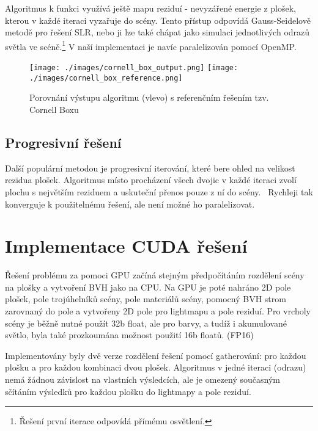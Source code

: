 \documentclass[czech]{pyt-report}
\begin{document}
Algoritmus k funkci využívá ještě mapu reziduí - nevyzářené energie z plošek, kterou v každé iteraci vyzařuje do scény. Tento přístup odpovídá Gauss-Seidelově metodě pro řešení SLR, nebo ji lze také chápat jako simulaci jednotlivých odrazů světla ve scéně.\footnote{Řešení první iterace odpovídá přímému osvětlení.} V naší implementaci je navíc paralelizován pomocí OpenMP.

\begin{figure}[h]
  \centering\leavevmode
  \texttt{[image: ./images/cornell\_box\_output.png]}
  \texttt{[image: ./images/cornell\_box\_reference.png]}\vskip-0.5cm
  \bigskip
  \caption{Porovnání výstupu algoritmu (vlevo) s referenčním řešením tzv. Cornell Boxu}
  \label{fig:cornell_box}
\end{figure}

\subsection{Progresivní řešení}
\label{sec:radiosita-prog}

Další populární metodou je progresivní iterování, které bere ohled na velikost rezidua plošek. Algoritmus místo procházení všech dvojic v každé iteraci zvolí plochu s největším reziduem a uskuteční přenos pouze z ní do scény.~\cite{Cohen1993} Rychleji tak konverguje k použitelnému řešení, ale není možné ho paralelizovat.

\section{Implementace CUDA řešení}
\label{sec:cuda}

Řešení problému za pomoci GPU začíná stejným předpočítáním rozdělení scény na plošky a vytvoření BVH jako na CPU. Na GPU je poté nahráno 2D pole plošek, pole trojúhelníků scény, pole materiálů scény, pomocný BVH strom zarovnaný do pole a vytvořeny 2D pole pro lightmapu a pole reziduí. Pro vrcholy scény je běžně nutné použít 32b float, ale pro barvy, a tudíž i akumulované světlo, byla také prozkoumána možnost použití 16b floatů. (FP16)

Implementovány byly dvě verze rozdělení řešení pomocí gatherování: pro každou plošku a pro každou kombinaci dvou plošek. Algoritmus v jedné iteraci (odrazu) nemá žádnou závislost na vlastních výsledcích, ale je omezený současným sčítáním výsledků pro každou plošku do lightmapy a pole reziduí.
\end{document}
